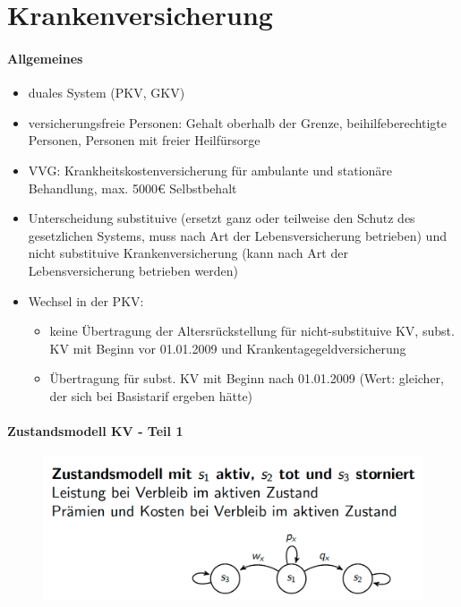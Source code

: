 \documentclass[12pt]{report}
\theoremstyle{dotless}
\theoremstyle{definition}
\begin{document}
\chapter{Krankenversicherung}

\subsubsection{Allgemeines}
\begin{itemize}
	\item duales System (PKV, GKV)
	\item versicherungsfreie Personen: Gehalt oberhalb der Grenze, beihilfeberechtigte Personen, Personen mit freier Heilfürsorge
	\item VVG: Krankheitskostenversicherung für ambulante und stationäre Behandlung, max. 5000€ Selbstbehalt
	\item Unterscheidung substituive (ersetzt ganz oder teilweise den Schutz des gesetzlichen Systems, muss nach Art der Lebensversicherung betrieben) und nicht substituive Krankenversicherung (kann nach Art der Lebensversicherung betrieben werden)
	\item Wechsel in der PKV: 
		\begin{itemize}
		\item keine Übertragung der Altersrückstellung für nicht-substituive KV, subst. KV mit Beginn vor 01.01.2009 und Krankentagegeldversicherung
		\item Übertragung für subst. KV mit Beginn nach 01.01.2009 (Wert: gleicher, der sich bei Basistarif ergeben hätte)
		\end{itemize}
\end{itemize}

\subsubsection{Zustandsmodell KV - Teil 1}
\begin{figure}[ht]
	\centering
	\includegraphics[width = .8\textwidth]{Bilder/ZustandModellKV.png}
\end{figure}
\end{document}

